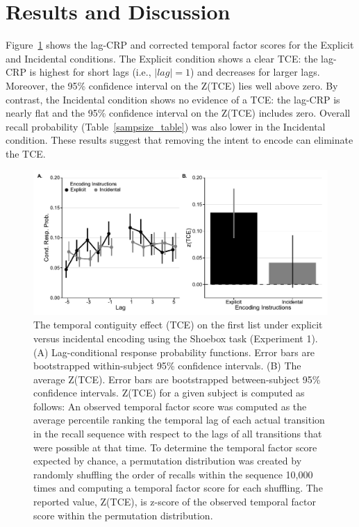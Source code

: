 \documentclass[jou,natbib,floatsintext]{apa6} %
\begin{document}
\section{Results and Discussion}

Figure~\ref{shoebox} shows the lag-CRP and corrected temporal factor scores for the Explicit and Incidental conditions. The Explicit condition shows a clear TCE: the lag-CRP is highest for short lags (i.e., $|lag|=1$) and decreases for larger lags. Moreover, the 95\% confidence interval on the Z(TCE) lies well above zero. By contrast, the Incidental condition shows no evidence of a TCE: the lag-CRP is nearly flat and the 95\% confidence interval on the Z(TCE) includes zero. Overall recall probability (Table~\ref{sampsize_table}) was also lower in the Incidental condition. These results suggest that removing the intent to encode can eliminate the TCE.


\newcommand\paneltext{(A) Lag-conditional response probability functions. Error bars are bootstrapped within-subject 95\% confidence intervals. (B) The average Z(TCE).  Error bars are bootstrapped between-subject 95\% confidence intervals. Z(TCE) for a given subject is computed as follows: An observed temporal factor score was computed as the average percentile ranking the temporal lag of each actual transition in the recall sequence with respect to the lags of all transitions that were possible at that time. To determine the temporal factor score expected by chance, a permutation distribution was created by randomly shuffling the order of recalls within the sequence 10,000 times and computing a temporal factor score for each shuffling. The reported value, Z(TCE), is z-score of the observed temporal factor score within the permutation distribution.}
\begin{figure}
\includegraphics{figures/E1_crp_list1.pdf}
\caption{The temporal contiguity effect (TCE) on the first list under explicit versus incidental encoding using the Shoebox task (Experiment 1). \paneltext}
\label{shoebox}
\end{figure}
\end{document}

